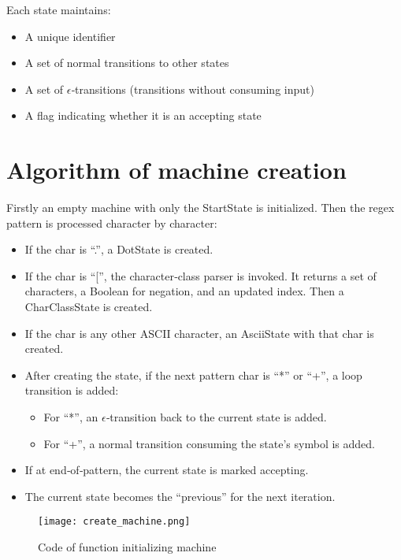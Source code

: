 \documentclass{article}
\begin{document}
Each state maintains:
\begin{itemize}
    \item A unique identifier
    \item A set of normal transitions to other states
    \item A set of $\epsilon$‑transitions (transitions without consuming input)
    \item A flag indicating whether it is an accepting state
\end{itemize}

\section{Algorithm of machine creation}
Firstly an empty machine with only the StartState is initialized. Then the regex pattern is processed character by character:
\begin{itemize}
    \item If the char is “.”, a DotState is created.
    \item If the char is “[”, the character‑class parser is invoked. It returns a set of characters, a Boolean for negation, and an updated index. Then a CharClassState is created.
    \item If the char is any other ASCII character, an AsciiState with that char is created.
    \item After creating the state, if the next pattern char is “*” or “+”, a loop transition is added:
      \begin{itemize}
        \item For “*”, an $\epsilon$‑transition back to the current state is added.
        \item For “+”, a normal transition consuming the state’s symbol is added.
      \end{itemize}
    \item If at end‑of‑pattern, the current state is marked accepting.
    \item The current state becomes the “previous” for the next iteration.
\end{itemize}

\begin{figure}[htbp]
  \centering
  \texttt{[image: create\_machine.png]}
  \caption{Code of function initializing machine}
  \label{fig:create_machine}
\end{figure}
\FloatBarrier
\end{document}
